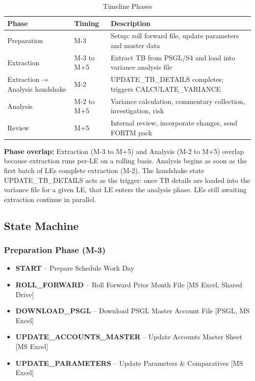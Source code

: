 \documentclass[11pt,a4paper]{article}
\begin{document}
\begin{table}[h]
\centering
\caption{Timeline Phases}
\begin{tabular}{@{}L{4.5cm}C{2.5cm}L{7cm}@{}}
\toprule
\textbf{Phase} & \textbf{Timing} & \textbf{Description} \\
\midrule
Preparation & M-3 & Setup: roll forward file, update parameters and master data \\
Extraction & M-3 to M+5 & Extract TB from PSGL/S4 and load into variance analysis file \\
Extraction$\rightarrow$Analysis handshake & M-2 & UPDATE\_TB\_DETAILS completes; triggers CALCULATE\_VARIANCE \\
Analysis & M-2 to M+5 & Variance calculation, commentary collection, investigation, risk \\
Review & M+5 & Internal review, incorporate changes, send FORTM pack \\
\bottomrule
\end{tabular}
\end{table}

\textbf{Phase overlap:} Extraction (M-3 to M+5) and Analysis (M-2 to M+5) overlap because 
extraction runs per-LE on a rolling basis. Analysis begins as soon as the first batch of LEs 
complete extraction (M-2). The handshake state UPDATE\_TB\_DETAILS acts as the trigger: once TB 
details are loaded into the variance file for a given LE, that LE enters the analysis phase. 
LEs still awaiting extraction continue in parallel.

\subsection{State Machine}

\subsubsection{Preparation Phase (M-3)}

\begin{itemize}[noitemsep]
    \item \textbf{START} -- Prepare Schedule Work Day
    \item \textbf{ROLL\_FORWARD} -- Roll Forward Prior Month File [MS Excel, Shared Drive]
    \item \textbf{DOWNLOAD\_PSGL} -- Download PSGL Master Account File [PSGL, MS Excel]
    \item \textbf{UPDATE\_ACCOUNTS\_MASTER} -- Update Accounts Master Sheet [MS Excel]
    \item \textbf{UPDATE\_PARAMETERS} -- Update Parameters \& Comparatives [MS Excel]
\end{itemize}
\end{document}
